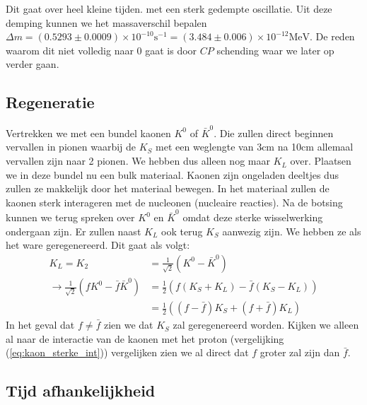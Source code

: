 \documentclass[../main.tex]{subfiles}
\begin{document}
Dit gaat over heel kleine tijden. met een sterk gedempte oscillatie. Uit deze demping kunnen we het massaverschil bepalen $\Delta m=(0.5293 \pm 0.0009) \times 10^{-10} \text{s}^{-1} = (3.484 \pm 0.006) \times 10^{-12} \text{MeV}$. De reden waarom dit niet volledig naar 0 gaat is door $CP$ schending waar we later op verder gaan.

\subsection{Regeneratie}%
\label{sub:regeneratie}

Vertrekken we met een bundel kaonen $K^0$ of $\bar{K}^0$. Die zullen direct beginnen vervallen in pionen waarbij de $K_S$ met een weglengte van 3cm na 10cm allemaal vervallen zijn naar 2 pionen. We hebben dus alleen nog maar $K_L$ over. Plaatsen we in deze bundel nu een bulk materiaal. Kaonen zijn ongeladen deeltjes dus zullen ze makkelijk door het materiaal bewegen. In het materiaal zullen de kaonen sterk interageren met de nucleonen (nucleaire reacties). Na de botsing kunnen we terug spreken over $K^0$ en $\bar{K}^0$ omdat deze sterke wisselwerking ondergaan zijn. Er zullen naast $K_L$ ook terug $K_S$ aanwezig zijn. We hebben ze als het ware geregenereerd. Dit gaat als volgt:
\begin{equation}
    \begin{aligned}
        \label{eq:ks_regen}
        K_{L}=K_{2}&=\frac{1}{\sqrt{2}}\left(K^{0}-\bar{K}^{0}\right)\\
        \rightarrow \frac{1}{\sqrt{2}}\left(f K^{0}-\bar{f} \bar{K}^{0}\right)&=\frac{1}{2}\left(f\left(K_{S}+K_{L}\right)-\bar{f}\left(K_{S}-K_{L}\right)\right) \\
                                                                              &=\frac{1}{2}\left((f-\bar{f}) K_{S}+(f+\bar{f}) K_{L}\right)
    \end{aligned}
\end{equation}
In het geval dat $f\neq \bar{f}$ zien we dat $K_S$ zal geregenereerd worden. Kijken we alleen al naar de interactie van de kaonen met het proton (vergelijking (\ref{eq:kaon_sterke_int})) vergelijken zien we al direct dat $f$ groter zal zijn dan $\bar{f}$.

\subsection{Tijd afhankelijkheid}%
\label{sub:tijd_afhankelijkheid}
\end{document}
